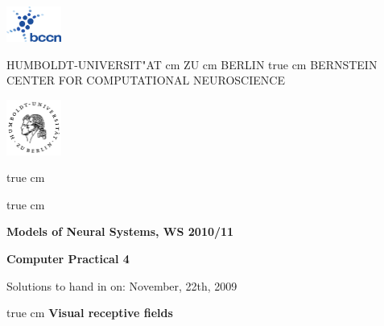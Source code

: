 \documentclass[12pt, a4]{article}
\begin{document}
\parbox{2cm}{
\includegraphics[width=1.8cm]{bccnlogo.pdf}
}
\parbox{11cm}{
\begin{center}
\large HUMBOLDT-UNIVERSIT"AT  cm ZU  cm BERLIN
 true cm
\mgross BERNSTEIN CENTER FOR COMPUTATIONAL NEUROSCIENCE
\end{center}
}
\parbox{2cm}
{
\hfill
\includegraphics[width=1.8cm]{hublogo.pdf}
}

 true cm



 true cm
\centerline{\bf Models of Neural Systems, WS 2010/11}
\centerline{\bf Computer Practical 4}
\centerline{Solutions to hand in on: November, 22th, 2009}

 true cm
{\bf Visual receptive fields}

\medskip
\end{document}
